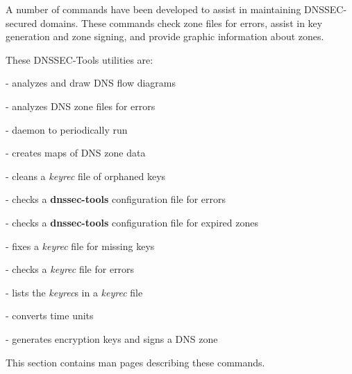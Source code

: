
A number of commands have been developed to assist in maintaining
DNSSEC-secured domains.  These commands check zone files for errors,
assist in key generation and zone signing, and provide graphic
information about zones.

These DNSSEC-Tools utilities are:

\begin{description}

\item{} - analyzes and draw DNS flow diagrams

\item{} - analyzes DNS zone files for errors

\item{} - daemon to periodically run 

\item{} - creates maps of DNS zone data

\item{} - cleans a {\it keyrec} file of orphaned keys

\item{} - checks a {\bf dnssec-tools} configuration file for errors

\item{} -  checks a {\bf dnssec-tools} configuration file for expired
zones

\item{} - fixes a {\it keyrec} file for missing keys

\item{} - checks a {\it keyrec} file for errors

\item{} - lists the {\it keyrec}s in a {\it keyrec} file

\item{} - converts time units

\item{} - generates encryption keys and signs a DNS zone

\end{description}

This section contains man pages describing these commands.













